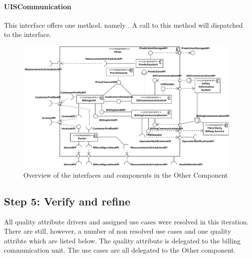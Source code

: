 \paragraph{UISCommunication}
\npar This interface offers one method, namely
. A call to this
method will dispatched to the  interface.

\begin{figure}[H]
	\begin{centering}
		\includegraphics[width=\textwidth]{figs/add-it10-interfaces.pdf}
		\caption{Overview of the interfaces and components in the Other Component}
		\label{fig:it10/interfaces}
	\end{centering}
\end{figure}

\subsection{Step 5: Verify and refine}
\label{add:it10/verification}

\npar All quality attribute drivers and assigned use cases were resolved in
this iteration. There are still, however, a number of non resolved use cases and
one quality attribte which are listed below. The quality attribute is
delegated to the billing communication unit. The use cases are all delegated to
the Other component.

